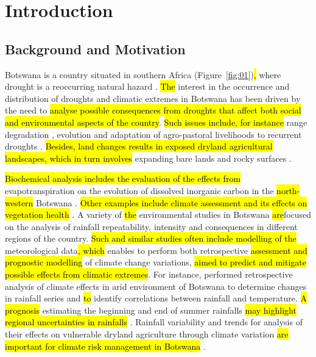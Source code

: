 \documentclass[ijgi,article,submit,pdftex,moreauthors]{Definitions/mdpi}
\begin{document}
\section{Introduction}

\subsection{Background and Motivation}

Botswana is a country situated in southern Africa (Figure~\ref{fig:01})\hl{,} where drought is a reoccurring natural hazard \cite{Batisani2011}. \hl{The }interest in the occurrence and distribution of droughts and climatic extremes in Botswana has been driven by the need to \hl{analyse possible consequences from droughts that affect both social and environmental aspects of the country}.  \hl{Such issues include, for instance} range degradation \cite{Vanderpost}, evolution and adaptation of agro-pastoral livelihoods to recurrent droughts \cite{Mogotsi}. \hl{Besides, land changes  results in exposed dryland agricultural landscapes, which in turn involves} expanding bare lands and rocky surfaces \cite{Akinyemi}.

\hl{Biochemical analysis includes the evaluation of the effects from} evapotranspiration on the evolution of dissolved inorganic carbon in the \hl{north-western} Botswana \cite{Atekwana}. \hl{Other examples include climate assessment and its effects on vegetation health} \cite{Ringrose2002}. A variety of \hl{the} environmental studies in Botswana \hl{are}focused on the analysis of rainfall repeatability, intensity and consequences in different regions of the country. \hl{Such and similar studies often include modelling of the} meteorological data\hl{, which} enables to perform both retrospective \hl{assessment and prognostic modelling} of climate change variations, \hl{aimed to predict and mitigate possible effects from climatic extremes}. For instance, \cite{Kenabatho} performed retrospective analysis of climate effects in arid environment of Botswana to determine changes in rainfall series and \hl{to} identify correlations between rainfall and temperature. \hl{A prognosis} estimating the beginning and end of summer rainfalls \hl{may highlight regional uncertainties in rainfalls} \cite{Byakatonda2019}. Rainfall variability and trends for analysis of their effects on vulnerable dryland agriculture through climate variation \hl{are important for climate risk management in Botswana} \cite{Batisani}.
\end{document}
